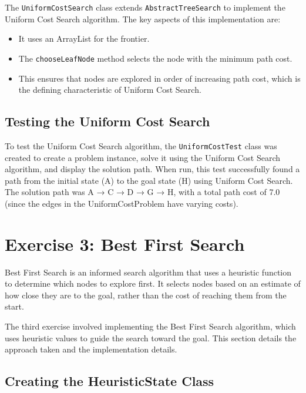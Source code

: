 \documentclass[12pt,a4paper]{article}
\newenvironment{infobox}[1]
  {\begin{tcolorbox}[colback=boxcolor,colframe=sectioncolor,title=#1,fonttitle=\bfseries]}
  {\end{tcolorbox}}
\begin{document}
The \texttt{UniformCostSearch} class extends \texttt{AbstractTreeSearch} to implement the Uniform Cost Search algorithm. The key aspects of this implementation are:

\begin{itemize}
    \item It uses an ArrayList for the frontier.
    \item The \texttt{chooseLeafNode} method selects the node with the minimum path cost.
    \item This ensures that nodes are explored in order of increasing path cost, which is the defining characteristic of Uniform Cost Search.
\end{itemize}

\subsection{Testing the Uniform Cost Search}

To test the Uniform Cost Search algorithm, the \texttt{UniformCostTest} class was created to create a problem instance, solve it using the Uniform Cost Search algorithm, and display the solution path. When run, this test successfully found a path from the initial state (A) to the goal state (H) using Uniform Cost Search. The solution path was A → C → D → G → H, with a total path cost of 7.0 (since the edges in the UniformCostProblem have varying costs).

\section{Exercise 3: Best First Search}

\begin{infobox}{What is Best First Search?}
Best First Search is an informed search algorithm that uses a heuristic function to determine which nodes to explore first. It selects nodes based on an estimate of how close they are to the goal, rather than the cost of reaching them from the start.
\end{infobox}

The third exercise involved implementing the Best First Search algorithm, which uses heuristic values to guide the search toward the goal. This section details the approach taken and the implementation details.

\subsection{Creating the HeuristicState Class}
\end{document}
